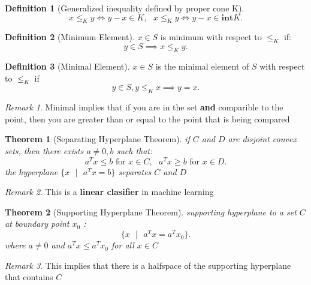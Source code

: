 \documentclass{report}
\newtheorem{theorem}{Theorem}[section]
\theoremstyle{remark} \newtheorem{remark}{Remark}[section]
\theoremstyle{definition}
\newtheorem{definition}{Definition}[section]
\theoremstyle{definition}
\theoremstyle{definition}
\theoremstyle{remark}
\newenvironment{bthm}
  {\begin{mdframed}\begin{theorem}}
  {\end{theorem}\end{mdframed}}
\begin{document}
\begin{definition}[Generalized inequality defined by proper cone K]
    \[
    x\le_K y \iff y-x\in K, \text{           } x\le_K y \iff y-x\in \textbf{int}K
    .\] 
       
\end{definition}

\begin{definition}[Minimum Element]
    $x \in S$ is minimum with respect to $\le_K$ if:
    \[
    y\in S \implies x \le_K y
    .\] 
       
\end{definition}

\begin{definition}[Minimal Element]
    $x \in S$ is the minimal element of $S$ with respect to $\le_K$ if
    \[
    y \in S, y\le_K x \implies y=x
    .\] 
       
\end{definition}

 \begin{remark}
    Minimal implies that if you are in the set \textbf{and} comparible to the point, then you are greater than or equal to the point that is being compared   
\end{remark}


\begin{bthm}[Separating Hyperplane Theorem]
    if $C$ and $D$ are disjoint convex sets, then there exists $a \neq  0, b$ such that:
    \[
    a^{T}x \le b \text{ for } x\in C, \text{     } a^{T}x \ge b \text{ for } x\in D
    .\] 
      the hyperplane $\{x \text{ }| \text{ }a^{T}x = b\}$ separates $C$ and $D$ 
\end{bthm}

\begin{remark}
    This is a \textbf{linear clasifier} in machine learning   
\end{remark}


\begin{theorem}[Supporting Hyperplane Theorem]
      supporting hyperplane to a set $C$ at boundary point $x_0$ :
      \[
      \{x \text{ }|\text{ }a^{T}x = a^{T}x_0\}
      .\] 
      where $a \neq 0$ and $a^{T}x \le a^{T}x_0$ for all $x\in C$
\end{theorem}

\begin{remark}
    This implies that there is a halfspace of the supporting hyperplane that contains $C$   
\end{remark}
\end{document}
